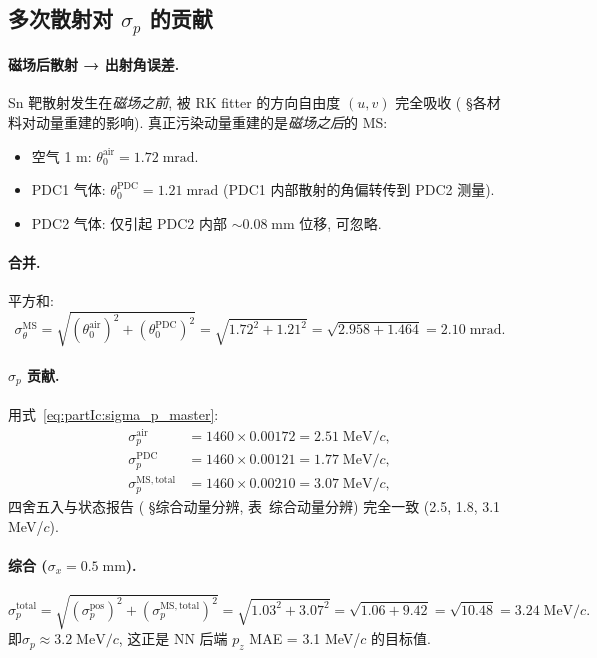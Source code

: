 \subsection{多次散射对 $\sigma_p$ 的贡献}

\paragraph{磁场后散射 → 出射角误差.} Sn 靶散射发生在\emph{磁场之前}, 被 RK fitter 的方向自由度 $(u, v)$ 完全吸收 (\StatusReport{} §各材料对动量重建的影响). 真正污染动量重建的是\emph{磁场之后}的 MS:
\begin{itemize}[nosep, leftmargin=2em]
  \item 空气 1 m: $\theta_0^\mathrm{air} = 1.72\;\mathrm{mrad}$.
  \item PDC1 气体: $\theta_0^\mathrm{PDC} = 1.21\;\mathrm{mrad}$ (PDC1 内部散射的角偏转传到 PDC2 测量).
  \item PDC2 气体: 仅引起 PDC2 内部 $\sim 0.08\;\mathrm{mm}$ 位移, 可忽略.
\end{itemize}

\paragraph{合并.} 平方和:
\begin{equation}
  \sigma_\theta^\mathrm{MS} = \sqrt{(\theta_0^\mathrm{air})^2 + (\theta_0^\mathrm{PDC})^2}
  = \sqrt{1.72^2 + 1.21^2}
  = \sqrt{2.958 + 1.464}
  = 2.10\;\mathrm{mrad}.
  \label{eq:partIc:sigma_theta_MS_total}
\end{equation}

\paragraph{$\sigma_p$ 贡献.} 用式~\eqref{eq:partIc:sigma_p_master}:
\begin{align}
  \sigma_p^\mathrm{air} &= 1460 \times 0.00172 = 2.51\;\mathrm{MeV}/c, \\
  \sigma_p^\mathrm{PDC} &= 1460 \times 0.00121 = 1.77\;\mathrm{MeV}/c, \\
  \sigma_p^\mathrm{MS,total} &= 1460 \times 0.00210 = 3.07\;\mathrm{MeV}/c,
\end{align}
四舍五入与状态报告 (\StatusReport{} §综合动量分辨, 表~综合动量分辨) 完全一致 (2.5, 1.8, 3.1 MeV/$c$).

\paragraph{综合 ($\sigma_x = 0.5\;\mathrm{mm}$).}
\begin{equation}
  \sigma_p^\mathrm{total} = \sqrt{(\sigma_p^\mathrm{pos})^2 + (\sigma_p^\mathrm{MS,total})^2}
  = \sqrt{1.03^2 + 3.07^2} = \sqrt{1.06 + 9.42}
  = \sqrt{10.48} = 3.24\;\mathrm{MeV}/c.
\end{equation}
即\textbf{$\sigma_p \approx 3.2\;\mathrm{MeV}/c$}, 这正是 NN 后端 $p_z$ MAE = 3.1 MeV/$c$ 的目标值.

